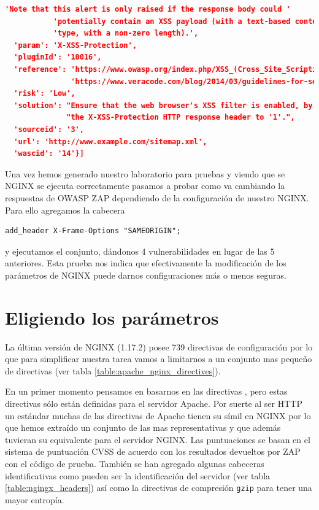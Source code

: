 \begin{lstlisting}[language=json,label={lst:owas_zap_welcome_message_alerts},caption={Alerts showed with NGINX default configuration}]
           'Note that this alert is only raised if the response body could '
           'potentially contain an XSS payload (with a text-based content '
           'type, with a non-zero length).',
  'param': 'X-XSS-Protection',
  'pluginId': '10016',
  'reference': 'https://www.owasp.org/index.php/XSS_(Cross_Site_Scripting)_Prevention_Cheat_Sheet\n'
               'https://www.veracode.com/blog/2014/03/guidelines-for-setting-security-headers/',
  'risk': 'Low',
  'solution': "Ensure that the web browser's XSS filter is enabled, by setting "
              "the X-XSS-Protection HTTP response header to '1'.",
  'sourceid': '3',
  'url': 'http://www.example.com/sitemap.xml',
  'wascid': '14'}]
\end{lstlisting}

\bigskip
Una vez hemos generado nuestro laboratorio para pruebas y viendo que se NGINX se ejecuta correctamente pasamos a probar como va cambiando la respuestas de OWASP ZAP dependiendo de la configuración de nuestro NGINX. Para ello agregamos la cabecera \begin{verbatim}add_header X-Frame-Options "SAMEORIGIN";\end{verbatim} y ejecutamos el conjunto, dándonos 4 vulnerabilidades en lugar de las 5 anteriores. Esta prueba nos indica que efectivamente la modificación de los parámetros de NGINX puede darnos configuraciones más o menos seguras.

\section{Eligiendo los parámetros}

La última versión de NGINX (1.17.2) posee 739 directivas de configuración por lo que para simplificar nuestra tarea vamos a limitarnos a un conjunto mas pequeño de directivas (ver tabla \ref{table:apache_nginx_directives}).

\bigskip
En un primer momento pensamos en basarnos en las directivas , pero estas directivas sólo están definidas para el servidor Apache. Por suerte al ser HTTP un estándar muchas de las directivas de Apache tienen su símil en NGINX por lo que hemos extraído un conjunto de las mas representativas y que además tuvieran su equivalente para el servidor NGINX. Las puntuaciones se basan en el sistema de puntuación CVSS de acuerdo con los resultados devueltos por ZAP con el código de prueba. También se han agregado algunas cabeceras identificativas como pueden ser la identificación del servidor (ver tabla \ref{table:ngingx_headers}) así como la directivas de compresión \texttt{gzip} para tener una mayor entropía.

